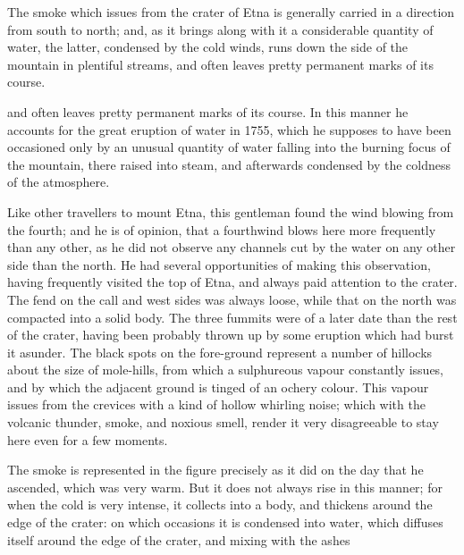 \documentclass{article}
\begin{document}
The smoke which issues from the crater of Etna is generally carried in a direction from south to north; and, as it brings along with it a considerable quantity of water, the latter, condensed by the cold winds, runs down the side of the mountain in plentiful streams, and often leaves pretty permanent marks of its course.

and often leaves pretty permanent marks of its course. In this manner he accounts for the great eruption of water in 1755, which he supposes to have been occasioned only by an unusual quantity of water falling into the burning focus of the mountain, there raised into steam, and afterwards condensed by the coldness of the atmosphere.

Like other travellers to mount Etna, this gentleman found the wind blowing from the fourth; and he is of opinion, that a fourthwind blows here more frequently than any other, as he did not observe any channels cut by the water on any other side than the north. He had several opportunities of making this observation, having frequently visited the top of Etna, and always paid attention to the crater. The fend on the call and west sides was always loose, while that on the north was compacted into a solid body. The three fummits were of a later date than the rest of the crater, having been probably thrown up by some eruption which had burst it asunder. The black spots on the fore-ground represent a number of hillocks about the size of mole-hills, from which a sulphureous vapour constantly issues, and by which the adjacent ground is tinged of an ochery colour. This vapour issues from the crevices with a kind of hollow whirling noise; which with the volcanic thunder, smoke, and noxious smell, render it very disagreeable to stay here even for a few moments.

The smoke is represented in the figure precisely as it did on the day that he ascended, which was very warm. But it does not always rise in this manner; for when the cold is very intense, it collects into a body, and thickens around the edge of the crater: on which occasions it is condensed into water, which diffuses itself around the edge of the crater, and mixing with the ashes
\end{document}
